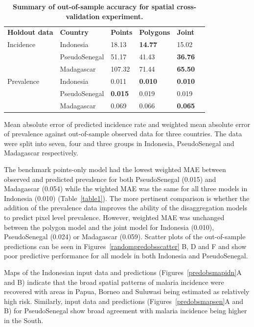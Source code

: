 \documentclass[10pt,letterpaper]{article}
\newlength\savedwidth
\newcommand\thickhline{\noalign{\global\savedwidth\arrayrulewidth\global\arrayrulewidth 2pt}%
\hline
\noalign{\global\arrayrulewidth\savedwidth}}
\begin{document}
\begin{table}[!ht]
\begin{adjustwidth}{-2.25in}{0in} %
\centering
\caption{
{\bf Summary of out-of-sample accuracy for spatial cross-validation experiment.}}
\begin{tabular}{llllll}
\hline
{\bf Holdout data} & {\bf Country} &  {\bf Points} & {\bf Polygons} & {\bf Joint} \\
\thickhline 
Incidence & Indonesia &  18.13 &  {\bf 14.77} &   15.02\\
& PseudoSenegal &  51.17 &  41.43 &   {\bf 36.76}\\
& Madagascar & 107.32 &  71.44 &   {\bf 65.50}\vspace{3mm}\\
Prevalence & Indonesia & 0.011 & {\bf 0.010} &  {\bf 0.010}\\
& PseudoSenegal & {\bf 0.015} & 0.019 &  0.019\\
& Madagascar & 0.069 & 0.066 &  {\bf 0.065}\\
\end{tabular}
\begin{flushleft}
Mean absolute error of predicted incidence rate and weighted mean absolute error of prevalence against out-of-sample observed data for three countries.
The data were split into seven, four and three groups in Indonesia, PseudoSenegal and Madagascar respectively.
\end{flushleft}
\label{table2}
\end{adjustwidth}
\end{table}




The benchmark points-only model had the lowest weighted MAE between observed and predicted prevalence for both PseudoSenegal (0.015) and  Madagascar (0.054) while the wighted MAE was the same for all three models in Indonesia (0.010) (Table~\ref{table1}).
The more pertinent comparison is whether the addition of the prevalence data improves the ability of the disaggregation models to predict pixel level prevalence.
However, weighted MAE was unchanged between the polygon model and the joint model for Indonesia (0.010), PseudoSenegal (0.024) or Madagascar (0.059).
Scatter plots of the out-of-sample predictions can be seen in Figures~\ref{randompredobsscatter} B, D and F and show poor predictive performance for all models in both Indonesia and PseudoSenegal.

Maps of the Indonesian input data and predictions (Figures~\ref{predobsmapidn}A and B) indicate that the broad spatial patterns of malaria incidence were recovered with areas in Papua, Borneo and Suluwasi being estimated as relatively high risk.
Similarly, input data and predictions (Figures~\ref{predobsmapsen}A and B) for PseudoSenegal show broad agreement with malaria incidence being higher in the South.
\end{document}
